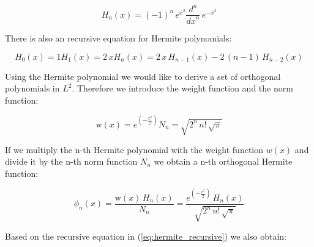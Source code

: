 \documentclass[12pt,twoside,a4paper]{article}
\numberwithin{equation}{subsection}
\numberwithin{figure}{subsection}
\begin{document}
\begin{equation} \label{eq:hermite_definition}
	H_n(x) = ( - 1)^{n} \, e ^ {x ^ 2} \frac { d ^ n } {{dx}^{n}} \, e^{ - x ^ 2}
\end{equation}

There is also an recursive equation for Hermite polynomials:

\begin{subequations} \label{eq:hermite_recursive}
  \begin{equation}   \label{eq:hrec_first}
    H_0 (x) = 1
  \end{equation}
  \begin{equation}   \label{eq:hrec_second}
    H_1 (x) = 2 \, x
  \end{equation}
  \begin{equation}   \label{eq:hrec_next}
    H_n (x) = 2 \, x \, H_{n - 1}(x) - 2 \, (n - 1) \, H_{n - 2}(x)
  \end{equation}
\end{subequations}

Using the Hermite polynomial we would like to derive a set of orthogonal polynomials in $L ^ 2$. Therefore we introduce the weight function and the norm function:

\begin{subequations} \label{eq:hermite_weight}
  \begin{equation}   \label{eq:hwht_weight}
    \mathrm{w}(x) = e^{( - \frac {x^{2}}{2})}
  \end{equation}
  \begin{equation}   \label{eq:hwht_iter}
    N_n = \sqrt{2^{n} \, n\mathrm{!} \, \sqrt{\pi }}
  \end{equation}
\end{subequations}

If we multiply the n-th Hermite polynomial with the weight function $w(x)$ and divide it by the n-th norm function $N_n$ we obtain a n-th orthogonal Hermite function:

\begin{equation} \label{eq:hermite_orthogonal}
  \phi_n (x) = \frac {\mathrm{w}(x) \, H_n (x)} {N_n} 
  	= \frac {e^{( - \frac {x ^ 2}{2})} \, H_n (x)} {\sqrt{2^{n} \, n\mathrm{!} \, \sqrt {\pi }}}
\end{equation}

Based on the recursive equation in (\ref{eq:hermite_recursive}) we also obtain:
\end{document}
